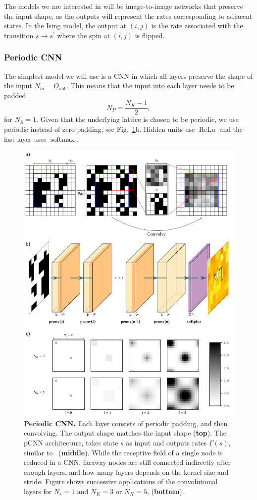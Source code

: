 The models we are interested in will be image-to-image networks that preserve the input shape, as the outputs will represent the rates corresponding to adjacent states. In the Ising model, the output at $(i, j)$ is the rate associated with the transition $s \rightarrow s^\prime$ where the spin at $(i, j)$ is flipped.
\subsubsection{Periodic CNN}
The simplest model we will use is a CNN in which all layers preserve the shape of the input $N_\text{in} = O_\text{out}$. This means that the input into each layer needs to be padded
\begin{equation}
		N_{P} = \frac{N_{K}-1}{2},
\end{equation}
for $N_S = 1$. Given that the underlying lattice is chosen to be periodic, we use periodic instead of zero padding, see Fig.~\ref{fig:pcnn}b. Hidden units use $\operatorname{ReLu}$ and the last layer uses $\operatorname{softmax}$. 
\begin{figure}[H]
	\centering
	\includegraphics[width=\linewidth]{Chapter4/Figs/Vector/pcnn.pdf}
	\caption[Periodic CNN]{\textbf{Periodic CNN.} Each layer consists of periodic padding, and then convolving. The output shape matches the input shape (\textbf{top}). The pCNN architecture, takes state $s$ as input and outputs rates $\Gamma(s)$, similar to~\cite{gispen2020ground} (\textbf{middle}). While the receptive field of a single node is reduced in a CNN, faraway nodes are still connected indirectly after enough layers, and how many layers depends on the kernel size and stride. Figure shows successive applications of the convolutional layers for $N_s=1$ and $N_K = 3$ or $N_K=5$, (\textbf{bottom}).}
	\label{fig:pcnn}
\end{figure}
